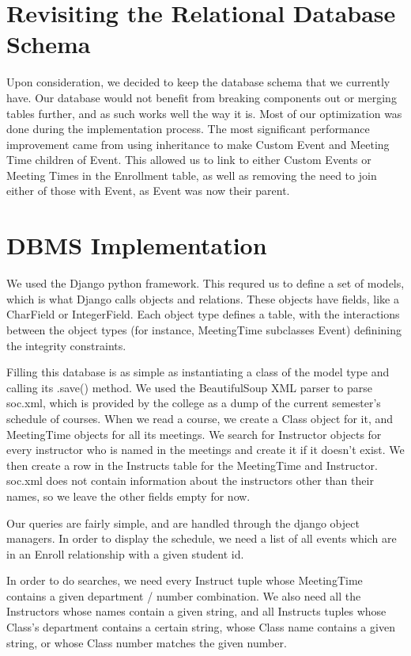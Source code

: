\documentclass[pdftex,12pt,letter]{article}
\begin{document}
\section{Revisiting the Relational Database Schema}
Upon consideration, we decided to keep the database schema that we currently have. Our database would not benefit from breaking components out or merging tables further, and as such works well the way it is. Most of our optimization was done during the implementation process. The most significant performance improvement came from using inheritance to make Custom Event and Meeting Time children of Event. This allowed us to link to either Custom Events or Meeting Times in the Enrollment table, as well as removing the need to join either of those with Event, as Event was now their parent.
\section{DBMS Implementation}
We used the Django python framework.  This requred us to define a set of models, which is what Django calls objects and relations.  These objects have fields, like a CharField or IntegerField.  Each object type defines a table, with the interactions between the object types (for instance, MeetingTime subclasses Event) definining the integrity constraints.  

Filling this database is as simple as instantiating a class of the model type and calling its .save() method.  We used the BeautifulSoup XML parser to parse soc.xml, which is provided by the college as a dump of the current semester's schedule of courses.  When we read a course, we create a Class object for it, and MeetingTime objects for all its meetings.  We search for Instructor objects for every instructor who is named in the meetings and create it if it doesn't exist.  We then create a row in the Instructs table for the MeetingTime and Instructor.  soc.xml does not contain information about the instructors other than their names, so we leave the other fields empty for now.

Our queries are fairly simple, and are handled through the django object managers.  In order to display the schedule, we need a list of all events which are in an Enroll relationship with a given student id.

In order to do searches, we need every Instruct tuple whose MeetingTime contains a given department / number combination.  We also need all the Instructors whose names contain a given string, and all Instructs tuples whose Class's department contains a certain string, whose Class name contains a given string, or whose Class number matches the given number.
\end{document}
